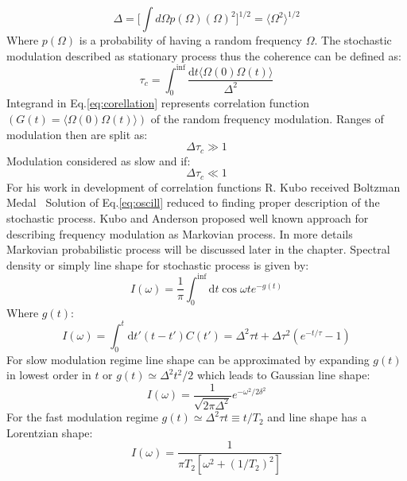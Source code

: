\begin{equation}\label{eq:harmonoscill}
\Delta=\Big[\int d\Omega p(\Omega)(\Omega)^2\Big]^{1/2}=\langle\Omega^2\rangle^{1/2} 
\end{equation}
Where $p(\Omega)$ is a probability of having a random frequency $\Omega$. The stochastic modulation described as stationary process thus the coherence can be defined as: 
\begin{equation}\label{eq:corellation}
\tau_c=\int_0^{\inf} \frac{\mathrm{d}t\langle\Omega(0)\Omega(t)\rangle}{\Delta^2}
\end{equation}
Integrand in Eq.\ref{eq:corellation} represents correlation function $(G(t)=\langle\Omega(0)\Omega(t)\rangle)$ of the random frequency modulation. Ranges of modulation then are split as: 
\begin{equation}\label{eq:slowmodulation}
\Delta \tau_c \gg 1
\end{equation}
Modulation considered as slow and if: 
\begin{equation}\label{eq:fastmodulation}
\Delta \tau_c \ll 1
\end{equation}
For his work in development of correlation functions R. Kubo received Boltzman Medal~\cite{kubo2} Solution of Eq.\ref{eq:oscill} reduced to finding proper description of the stochastic process. Kubo and Anderson proposed well known approach for describing frequency modulation as Markovian process. In more details Markovian probabilistic process will be discussed later in the chapter. Spectral density or simply line shape for stochastic process is given by: 
\begin{equation}\label{eq:fastmodulation}
I(\omega)=\frac{1}{\pi}\int_0^{\inf}\mathrm{d}t\cos\omega te^{-g(t)}
\end{equation}
Where $g(t)$:
\begin{equation}\label{eq:fastmodulation}
I(\omega)=\int_0^{t}\mathrm{d}t'(t-t')C(t')=\Delta^2\tau t+\Delta\tau^2(e^{-t/\tau}-1)
\end{equation}
For slow modulation regime line shape can be approximated by expanding $g(t)$ in lowest order in $t$ or $g(t)\simeq \Delta^2t^2/2$ which leads to Gaussian line shape: 
\begin{equation}\label{eq:fastmodulation}
I(\omega)=\frac{1}{\sqrt{2\pi\Delta^2}}e^{-\omega^2/2\delta^2}
\end{equation} 
For the fast modulation regime $g(t)\simeq \Delta^2\tau t\equiv t/T_2$ and line shape has a Lorentzian shape: 
\begin{equation}\label{eq:fastmodulationshape}
I(\omega)=\frac{1}{\pi T_2[\omega^2+(1/T_2)^2]}
\end{equation}
